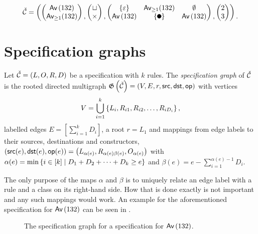 \[
    \spec{C} = \left(
    \begin{pmatrix}\Av{132}\\\textsf{Av}_{\geq1}(132)\end{pmatrix}
    \begin{matrix}\\,\end{matrix}
    \begin{pmatrix}\sqcup\\ \times\end{pmatrix}
    \begin{matrix}\\,\end{matrix}
    \begin{pmatrix}
    \set{\varepsilon} & \textsf{Av}_{\geq1}(132) & \emptyset \\
    \Av{132} & \set{\point{0.1}} & \Av{132}
    \end{pmatrix}
    \begin{matrix}\\,\end{matrix}
    \begin{pmatrix}2\\3\end{pmatrix}
    \right)\begin{matrix}\\.\end{matrix}
\]

\section{Specification graphs}
\begin{definition}
Let $\check{\mathcal{C}} = \left(L, O, R, D\right)$ be a specification with $k$ rules. The \emph{specification graph} of $\check{\mathcal{C}}$ is the rooted directed multigraph $\mathfrak{G}\left(\check{\mathcal{C}}\right) = (V,E,r,\textsf{src},\textsf{dst},\textsf{op})$ with vertices 
\[
V = \bigcup_{i=1}^k\left\{L_i,R_{i1},R_{i2},\dotsc,R_{iD_i}\right\},
\]
labelled edges $E = \left[\sum_{i=1}^kD_i\right]$, a root $r = L_1$ and mappings from edge labels to their sources, destinations and constructors, $(\textsf{src}(e), \textsf{dst}(e), \textsf{op}(e)) = \left(L_{\alpha(e)},R_{\alpha(e)\beta(e)},O_{\alpha(e)}\right)$
with $\alpha(e) = \min\left\{i \in [k] \mid D_1 + D_2 + \dotsm + D_k \geq e\right\}$ and $\beta(e) = e-\sum_{i=1}^{\alpha(e) - 1}D_i$.
\end{definition}

The only purpose of the maps $\alpha$ and $\beta$ is to uniquely relate an edge label with a rule and a class on its right-hand side. How that is done exactly is not important and any such mappings would work. An example for the aforementioned specification for $\textsf{Av}\left(132\right)$ can be seen in .
\begin{figure}[ht!]
    \centering
    
    \caption{The specification graph for a specification for $\textsf{Av}\left(132\right)$.}
    \label{fig:specgraph132}
\end{figure}

